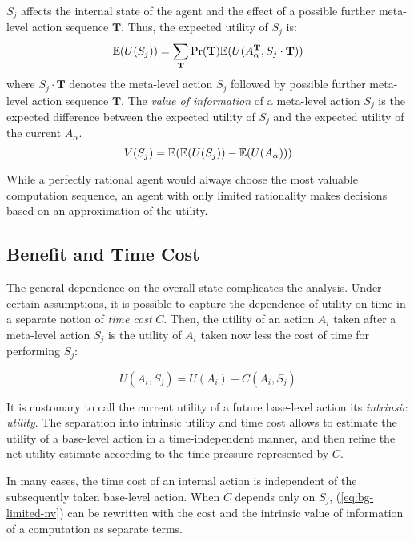 $S_j$ affects the internal state of the agent and the effect of
a possible further meta-level action sequence $\mathbf{T}$. Thus, the expected utility of
$S_j$ is:
\begin{equation}
\label{eq:bg-limited-su}
\mathbb{E}(U(S_j))=\sum_{\mathbf{T}}\Pr(\mathbf{T})\mathbb{E}(U(A_{\alpha}^\mathbf{T},S_j\cdot\mathbf{T}))
\end{equation}
where $S_j\cdot\mathbf{T}$ denotes the meta-level action $S_j$
followed by possible further meta-level action sequence $\mathbf{T}$.
The {\em value of information} of a meta-level action $S_j$ is
the expected difference between the expected utility of $S_j$ and the
expected utility of the current $A_\alpha$.
\begin{equation}
\label{eq:bg-limited-nv}
V(S_j)=\mathbb{E}(\mathbb{E}(U(S_j))-\mathbb{E}(U(A_\alpha)))
\end{equation}

While a perfectly rational agent would always choose the most valuable
computation sequence, an agent with only limited rationality makes
decisions based on an approximation of the utility.

\subsection{Benefit and Time Cost}
\label{sec:ratimeta-benefit-timecost}

The general dependence on the overall state complicates the analysis. Under
certain assumptions, it is possible to capture the dependence of utility on time in a
separate notion of {\em time cost} $C$. Then, the utility of an action $A_i$ taken
 after a meta-level action $S_j$ is the utility of $A_i$ taken now less the
cost of time for performing $S_j$:

\begin{equation}
\label{eq:bg-limited-iu}
U(A_i, S_j) = U(A_i) - C(A_i, S_j)
\end{equation}

It is customary to call the current utility of a future base-level
action its {\em intrinsic utility}. The separation into intrinsic
utility and time cost allows to estimate the utility of a base-level
action in a time-independent manner, and then refine the net utility
estimate according to the time pressure represented by $C$.

In many cases, the time cost of an internal action is independent of
the subsequently taken base-level action. When $C$ depends only on
$S_j$, (\ref{eq:bg-limited-nv}) can be rewritten with the cost and the
intrinsic value of information of a computation as separate terms.

